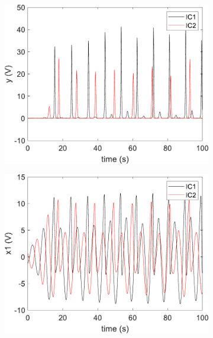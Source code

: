 	\begin{figure}
        \centering
        \begin{subfigure}[b]{0.3\textwidth}
            \centering
            \includegraphics[scale=0.35]{figs/yvstValid.pdf}
        \end{subfigure}
        \begin{subfigure}[b]{0.3\textwidth}  
            \centering 
            \includegraphics[scale=0.35]{figs/x1vstValid.pdf}
        \end{subfigure}
        \begin{subfigure}[b]{0.3\textwidth}   
            \centering 

\end{subfigure}
\end{figure}
